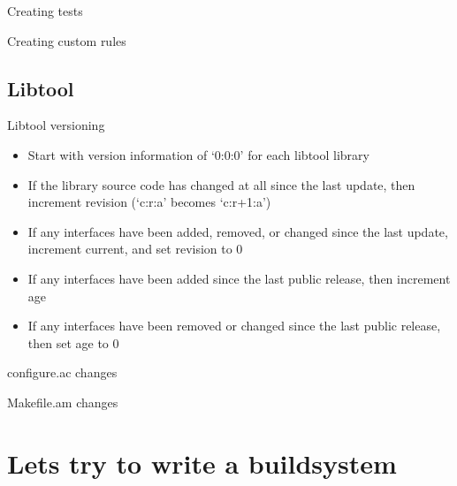 \documentclass{beamer}
\begin{document}
\begin{frame}[t]{Creating tests}
	\begin{small}
	
	\end{small}
\end{frame}

\begin{frame}[t]{Creating custom rules}
	\begin{small}
	
	\end{small}
\end{frame}

\subsection{Libtool}

\begin{frame}{Libtool versioning}
	\begin{itemize}
	\item Start with version information of ‘0:0:0’ for each libtool library
	\item If the library source code has changed at all since the last update, then increment revision (‘c:r:a’ becomes ‘c:r+1:a’)
	\item If any interfaces have been added, removed, or changed since the last update, increment current, and set revision to 0
	\item If any interfaces have been added since the last public release, then increment age
	\item If any interfaces have been removed or changed since the last public release, then set age to 0
	\end{itemize}
\end{frame}

\begin{frame}[t]{configure.ac changes}
	\begin{small}
	
	\end{small}
\end{frame}

\begin{frame}[t]{Makefile.am changes}
	\begin{small}
	
	\end{small}
\end{frame}

\section{Lets try to write a buildsystem}
\end{document}
